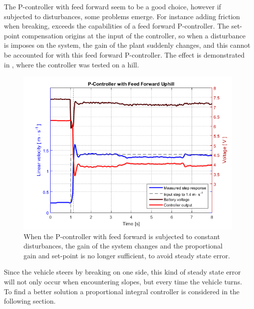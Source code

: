 The P-controller with feed forward seem to be a good choice, however if subjected to disturbances, some problems emerge. For instance adding friction when breaking, exceeds the capabilities of a feed forward P-controller. The set-point compensation origins at the input of the controller, so when a disturbance is imposes on the system, the gain of the plant suddenly changes, and this cannot be accounted for with this feed forward P-controller. The effect is demonstrated in , where the controller was tested on a hill.
%
\begin{figure}[H]
 	\centering
 	\includegraphics[width=\textwidth]{figures/hillPfeedForward}
 	\caption{When the P-controller with feed forward is subjected to constant disturbances, the gain of the system changes and the proportional gain and set-point is no longer sufficient, to avoid steady state error.}
 	\label{fig:hillPfeedForward}
\end{figure}
%
Since the vehicle steers by breaking on one side, this kind of steady state error will not only occur when encountering slopes, but every time the vehicle turns. To find a better solution a proportional integral controller is considered in the following section.
%
